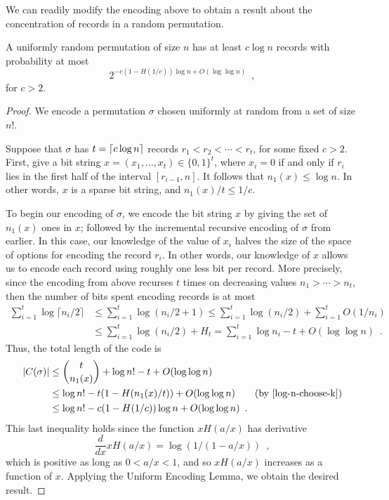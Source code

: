 \documentclass{patmorin}
\begin{document}
We can readily modify the encoding above to obtain a result about the
concentration of records in a random permutation.

\begin{thm}
  A uniformly random permutation of size $n$ has at least $c \log n$
  records with probability at most
  \[
    2^{-c (1 - H(1/c)) \log n + O(\log \log n)} \enspace ,
  \]
  for $c > 2$.
\end{thm}
\begin{proof}
  We encode a permutation $\sigma$ chosen uniformly at random from a
  set of size $n!$.

  Suppose that $\sigma$ has $t = {\lceil c\log n \rceil}$ records $r_1 < r_2 <
  \cdots < r_t$, for some fixed $c > 2$. First, give a bit string $x =
  (x_1, \dots, x_t) \in \{0, 1\}^t$, where $x_i = 0$ if and only if
  $r_i$ lies in the first half of the interval $[r_{i - 1}, n]$. It
  follows that $n_1(x) \leq \log n$. In other words, $x$ is a sparse
  bit string, and $n_1(x)/t \leq 1/c$.

  To begin our encoding of $\sigma$, we encode the bit string $x$ by
  giving the set of $n_1(x)$ ones in $x$; followed by the incremental
  recursive encoding of $\sigma$ from earlier. In this case, our
  knowledge of the value of $x_i$ halves the size of the space of
  options for encoding the record $r_i$. In other words, our knowledge
  of $x$ allows us to encode each record using roughly one less bit
  per record. More precisely, since the encoding from above recurses
  $t$ times on decreasing values $n_1 > \cdots > n_t$, then the number
  of bits spent encoding records is at most
  \begin{align*}
    \sum_{i = 1}^t \log \lceil n_i/2 \rceil &\leq \sum_{i = 1}^t \log (n_i/2 + 1)
                                              \leq \sum_{i = 1}^t \log (n_i/2) + \sum_{i = 1}^t O(1/n_i) \\
                                            &\leq \sum_{i = 1}^t \log (n_i/2) + H_t = \sum_{i = 1}^t \log n_i - t + O(\log \log n) \enspace .
  \end{align*}
  Thus, the total length of the code is
  \begin{align*}
    |C(\sigma)| &\leq \binom{t}{n_1(x)} + \log n! - t + O(\log \log n) \\
                &\leq \log n! - t (1 - H(n_1(x)/t)) + O(\log \log n) \tag{by \eqref{log-n-choose-k}}\\
                &\leq \log n! - c (1 - H(1/c))\log n + O(\log \log n) \enspace .
  \end{align*}
  This last inequality holds since the function $x H(a/x)$ has
  derivative
  \[
    \frac{d}{d x} x H(a/x) = \log (1/(1 - a/x)) \enspace ,
  \]
  which is positive as long as $0 < a/x < 1$, and so $x H(a/x)$
  increases as a function of $x$. Applying the Uniform Encoding Lemma,
  we obtain the desired result.
\end{proof}
\end{document}
